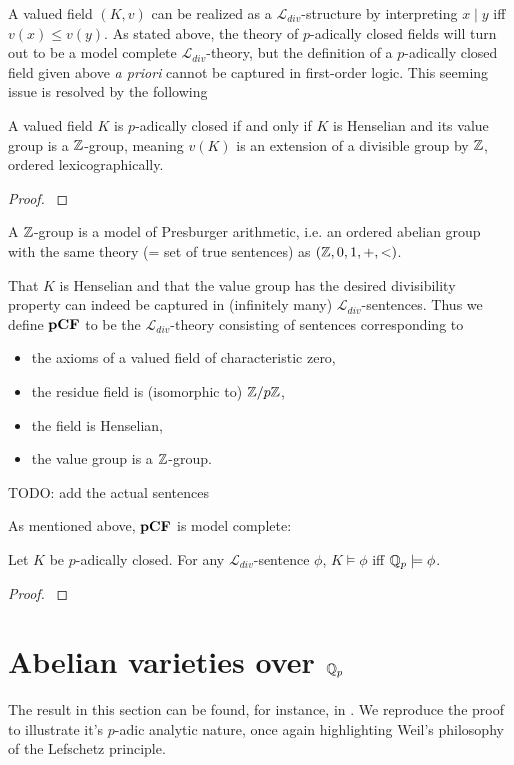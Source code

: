 A valued field $(K,v)$ can be realized as a $\mathcal{L}_{div}$-structure by interpreting $x\mid y$ iff $v(x)\leq v(y)$. As stated above, the theory of $p$-adically closed fields will turn out to be a model complete $\mathcal{L}_{div}$-theory, but the definition of a $p$-adically closed field given above \emph{a priori} cannot be captured in first-order logic. This seeming issue is resolved by the following

\begin{theorem}
A valued field $K$ is $p$-adically closed if and only if $K$ is Henselian and its value group is a $\mathbb{Z}$-group, meaning $v(K)$ is an extension of a divisible group by $\mathbb{Z}$, ordered lexicographically.
\end{theorem}
\begin{proof}
\cite[Theorem 3.1]{formallyp-adic}
\end{proof}

\begin{remark}
A $\mathbb{Z}$-group is a model of Presburger arithmetic, i.e. an  ordered abelian group with the same theory (= set of true sentences) as $(\mathbb{Z},0,1,+,<)$.
\end{remark}

That $K$ is Henselian and that the value group has the desired divisibility property can indeed be captured in (infinitely many) $\mathcal{L}_{div}$-sentences. Thus we define ${\normalfont\textbf{pCF}}$ to be the $\mathcal{L}_{div}$-theory consisting of sentences corresponding to
\begin{itemize}
	\item the axioms of a valued field of characteristic zero,
	\item the residue field is (isomorphic to) $\mathbb{Z}/p\mathbb{Z}$,
	\item the field is Henselian,
	\item the value group is a $\mathbb{Z}$-group.
\end{itemize}
TODO: add the actual sentences

As mentioned above, ${\normalfont\textbf{pCF}}$ is model complete:

\begin{theorem}
Let $K$ be $p$-adically closed. For any $\mathcal{L}_{div}$-sentence $\phi$, $K\models \phi$ iff $\mathbb{Q}_p\models \phi$.
\end{theorem}
\begin{proof}
\cite[Theorem 5.1]{formallyp-adic}
\end{proof}

\section{Abelian varieties over $\mathbb{Q}_p$}
The result in this section can be found, for instance, in \cite{clark2019there}. We reproduce the proof to illustrate it's $p$-adic analytic nature, once again highlighting Weil's philosophy of the Lefschetz principle.

